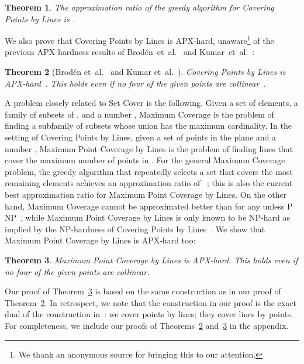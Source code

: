 \documentclass[letterpaper,11pt]{article}
\newtheorem{theorem}{Theorem}
\def\etal{{et~al.}}
\begin{document}
\begin{theorem}\label{thm:greedy}
The approximation ratio of the greedy algorithm for {\sc Covering Points by Lines} is
.
\end{theorem}

We also prove that {\sc Covering Points by Lines} is APX-hard, unaware\footnote{We
  thank an anonymous source for bringing this to our attention.} of
the previous APX-hardness results of Brod\'en~\etal~\cite{BHN01} and
Kumar~\etal~\cite{KAR00}:
\begin{theorem}[Brod\'en \etal~\cite{BHN01} and Kumar \etal~\cite{KAR00}]
\label{thm:min}
{\sc Covering Points by Lines} is APX-hard~\textup{\cite{BHN01,KAR00}}.
This holds even if no four of the given points are collinear~\textup{\cite{BHN01}}.
\end{theorem}

A problem closely related to {\sc Set Cover} is the following.
Given a set  of  elements, a family  of  subsets of ,
and a number ,
{\sc Maximum Coverage} is the problem of finding a subfamily 
of  subsets whose union has the maximum cardinality.
In the setting of {\sc Covering Points by Lines},
given a set  of  points in the plane and a number ,
{\sc Maximum Point Coverage by Lines}
is the problem of finding  lines
that cover the maximum number of points in .
For the general {\sc Maximum Coverage} problem,
the greedy algorithm that repeatedly selects a set that covers the most
remaining elements achieves an approximation ratio of
~\cite[Section~3.9]{Ho97};
this is also the current best approximation ratio for 
{\sc Maximum Point Coverage by Lines}. 
On the other hand, {\sc Maximum Coverage} cannot be approximated better than
 for any  unless P  NP~\cite{Fe98},
while {\sc Maximum Point Coverage by Lines} is only known to be NP-hard as implied by
the NP-hardness of {\sc Covering Points by Lines}~\cite{MT82}.
We show that {\sc Maximum Point Coverage by Lines} is APX-hard too:

\begin{theorem}\label{thm:max}
{\sc Maximum Point Coverage by Lines} is APX-hard.
This holds even if no four of the given points are collinear.
\end{theorem}

Our proof of Theorem~\ref{thm:max} is based on the same construction
as in our proof of Theorem~\ref{thm:min}.
In retrospect, we note that
the construction in our proof is the exact dual of the construction
in~\cite{BHN01}: we cover points by lines; they cover lines by points.
For completeness, we include our proofs of Theorems~\ref{thm:min} and~\ref{thm:max}
in the appendix.
\end{document}
